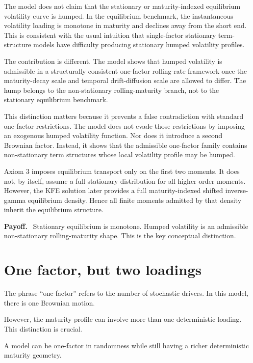 \documentclass[11pt]{article}
\theoremstyle{plainbreak}
\newenvironment{takeaway}{%
    \vspace{0.4em}\noindent\textbf{Payoff.}\ }{\par\vspace{0.4em}}
\begin{document}
The model does not claim that the stationary or maturity-indexed equilibrium volatility curve is humped. In the equilibrium benchmark, the instantaneous volatility loading is monotone in maturity and declines away from the short end. This is consistent with the usual intuition that single-factor stationary term-structure models have difficulty producing stationary humped volatility profiles.

The contribution is different. The model shows that humped volatility is admissible in a structurally consistent one-factor rolling-rate framework once the maturity-decay scale and temporal drift-diffusion scale are allowed to differ. The hump belongs to the non-stationary rolling-maturity branch, not to the stationary equilibrium benchmark.

This distinction matters because it prevents a false contradiction with standard one-factor restrictions. The model does not evade those restrictions by imposing an exogenous humped volatility function. Nor does it introduce a second Brownian factor. Instead, it shows that the admissible one-factor family contains non-stationary term structures whose local volatility profile may be humped.

Axiom 3 imposes equilibrium transport only on the first two moments. It does not, by itself, assume a full stationary distribution for all higher-order moments. However, the KFE solution later provides a full maturity-indexed shifted inverse-gamma equilibrium density. Hence all finite moments admitted by that density inherit the equilibrium structure.

\begin{takeaway}
Stationary equilibrium is monotone. Humped volatility is an admissible non-stationary rolling-maturity shape. This is the key conceptual distinction.
\end{takeaway}

\section{One factor, but two loadings}

The phrase ``one-factor'' refers to the number of stochastic drivers. In this model, there is one Brownian motion.

However, the maturity profile can involve more than one deterministic loading. This distinction is crucial.

A model can be one-factor in randomness while still having a richer deterministic maturity geometry.
\end{document}
